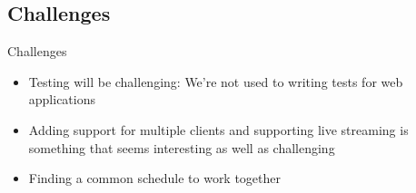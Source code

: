 \documentclass{beamer}
\begin{document}
\subsection{Challenges}
\begin{frame}{Challenges}
\begin{itemize}
\item Testing will be challenging: We're not used to writing tests for web applications
\item Adding support for multiple clients and supporting live streaming is something that seems interesting as well as challenging
\item Finding a common schedule to work together
\end{itemize}
\end{frame}
\end{document}
